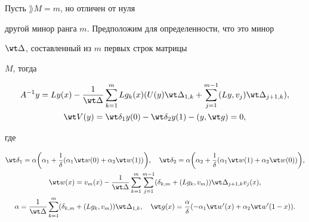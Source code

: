 \begin{notenonum}


Пусть $\rang M=m$, но отличен от нуля


другой минор ранга $m$. Предположим для определенности, что это минор


$\wt\Delta$, составленный из $m$ первых строк матрицы


$M$, тогда


\begin{gather*}


A^{-1}y=Ly(x)-\frac 1{\wt\Delta}\sum\limits^m_{k=1}Lg_k(x)(U(y)\wt


\Delta_{1,k}+\sum\limits^{m-1}_{j=1}(Ly,v_j)\wt\Delta_{j+1,k}), \\


%


\wt V(y)=\wt\delta_1y(0)-\wt\delta_2y(1)-(y,\wt g)=0,


\end{gather*}


где


\begin{gather*}


\wt\delta_1=\alpha\bigg(\alpha_1+\frac 1\delta(\alpha_1\wt w(0)+


\alpha_2\wt w(1))\bigg),\quad


\wt\delta_2=\alpha\bigg(\alpha_2+\frac 1\delta(\alpha_1\wt w(1)+


\alpha_2\wt w(0))\bigg), \\


%


\wt w(x)=v_m(x)-\frac 1{\wt\Delta}\sum\limits_{k=1}^m


\sum\limits_{j=1}^{m-1}(\delta_{k,m}+(Lg_k,v_m))\wt


\Delta_{j+1,k}v_j(x), \\


%


\alpha=\frac 1{\wt\Delta}\sum\limits^m_{k=1}(\delta_{k,m}+(Lg_k,v_m))


\wt\Delta_{1,k}, \quad


\wt g(x)=\frac{\alpha}{\delta}


(-\alpha_1\wt w'(x)+\alpha_2\wt w'(1-x)).


\end{gather*}


\end{notenonum}


\medskip





